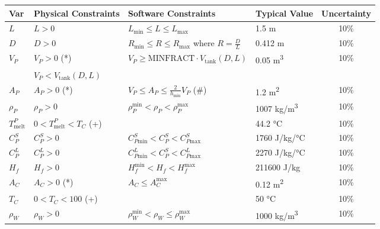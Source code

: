 \documentclass[12pt]{article}
\begin{document}
\begin{table}[!h]
  \caption{Input Data Constraints} \label{TblInputVar}
  \renewcommand{\arraystretch}{1.2}
\noindent \begin{longtable*}{l l l l c} 
  \toprule
  \textbf{Var} & \textbf{Physical Constraints} & \textbf{Software Constraints} &
                             \textbf{Typical Value} & \textbf{Uncertainty}\\
  \midrule 
  $L$ & $L > 0$ & $L_{\text{min}} \leq L \leq L_{\text{max}}$ & 1.5 \si[per-mode=symbol] {\metre} & 10\%
  \\
  $D$ & $D > 0$ & $R_\text{min} \leq R \leq R_\text{max}$ where $R = \frac{D}{L}$ 
	& 0.412 \si[per-mode=symbol] {\metre} & 10\% %
  \\
  $V_P$ & $V_P > 0$ (*) & $ V_P \geq \text{MINFRACT} \cdot V_{\text{tank}}(D, L) $ &
	0.05 \si[per-mode=symbol] {\cubic\metre} & 10\%
  \\
  & $V_P < V_{\text{tank}}(D, L)$ & & & 
  \\
  $A_P$ & $A_P > 0$ (*) & $V_P \leq A_P \leq \frac{2}{h_\text{min}} V_P$ (\#) & 1.2
       \si[per-mode=symbol] {\square\metre} & 10\%
  \\
  $\rho_P$ & $\rho_P > 0$ & $\rho_P^{\text{min}} < \rho_P < \rho_P^{\text{max}}$ & 1007 \si[per-mode=symbol]
                            {\kilogram\per\cubic\metre} & 10\%
  \\
  $T_\text{melt}^{P}$ 	& $0 < T_\text{melt}^{P} < T_C$ (+) & &  44.2 
	\si[per-mode=symbol] {\celsius} & 10\%
  \\
  $C_P^S$ & $C_P^S > 0$ & $C_{P\text{min}}^S < C_P^S < C_{P\text{max}}^S$ & 1760 
	\si[per-mode=symbol] {\joule\per\kilo\gram\per\celsius} & 10\%
  \\
  $C_P^L$ & $C_P^L > 0$ & $C_{P\text{min}}^L < C_P^S < C_{P\text{max}}^L$ & 2270 
	\si[per-mode=symbol] {\joule\per\kilo\gram\per\celsius} & 10\%
  \\
  $H_f$ & $H_f > 0$ & $H_f^{\text{min}} < H_f < H_f^{\text{max}}$ & 211600 
	\si[per-mode=symbol] {\joule\per\kilo\gram} & 10\%
  \\
  $A_C$ & $A_C > 0$ (*) & $A_C \leq A_C^{\text{max}}$ & 0.12 \si[per-mode=symbol] {\square\metre} & 10\%
  \\
  $T_C$ & $0 < T_C < 100$ (+)	& & 50 \si[per-mode=symbol] {\celsius} & 10\%
  \\
  $\rho_W$ & $\rho_W > 0$ & $\rho_W^{\text{min}} < \rho_W \leq \rho_W^{\text{max}}$ 
	& 1000 \si[per-mode=symbol] {\kilo\gram\per\cubic\metre} & 10\%

\end{longtable*}
\end{table}
\end{document}
